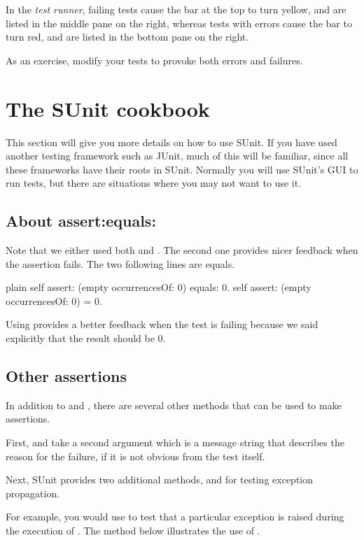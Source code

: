 \documentclass[10pt,twoside,english]{_support/latex/sbabook/sbabook}
\begin{document}
In the \textit{test runner}, failing tests cause the bar at the top to turn yellow, and are listed in the middle pane on
the right, whereas tests with errors cause the bar to turn red, and are listed in
the bottom pane on the right.

As an exercise, modify your tests to provoke both errors and failures.
\section{The SUnit cookbook}
This section will give you more details on how to use SUnit. If you have used
another testing framework such as JUnit, much of this will be familiar, since
all these frameworks have their roots in SUnit. Normally you will use SUnit's
GUI to run tests, but there are situations where you may not want to use it.
\subsection{About assert:equals:}
Note that we either used both  and . The second one provides nicer 
feedback when the assertion fails. The two following lines are equals. 

\begin{displaycode}{plain}
self assert: (empty occurrencesOf: 0) equals: 0.
self assert: (empty occurrencesOf: 0) = 0.
\end{displaycode}

Using  provides a better feedback when the test is failing because we
said explicitly that the result should be 0. 
\subsection{Other assertions}
In addition to  and , there are several other methods that
can be used to make assertions.

First,  and 
take a second argument which is a message string that describes
the reason for the failure, if it is not obvious from the test itself. 

Next, SUnit provides two additional methods,  and
 for testing exception propagation.

For example, you would use  to test
that a particular exception is raised during the execution of . The
method below illustrates the use of .
\end{document}
